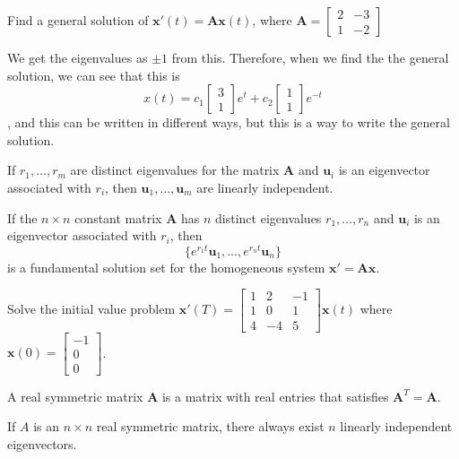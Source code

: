 \documentclass[../diffeq.tex]{subfiles}
\begin{document}
\begin{example}
    Find a general solution of $\textbf{x}'(t)=\textbf{Ax}(t)$, where $\textbf{A}=\begin{bmatrix}
        2 & -3\\
        1 & -2
    \end{bmatrix}$

    We get the eigenvalues as $\pm 1$ from this. Therefore, when we find the the general solution, we can see that this is 
    \[ x(t)=c_1\begin{bmatrix}
        3\\1
    \end{bmatrix}e^t + c_2\begin{bmatrix}
        1\\1
    \end{bmatrix}e^{-t} \], and this can be written in different ways, but this is a way to write the general solution.
\end{example}

\begin{theorem}
    If $r_1,\dots,r_m$ are distinct eigenvalues for the matrix $\textbf{A}$ and $\textbf{u}_i$ is an eigenvector associated with $r_i$, then $\textbf{u}_1,\dots,\textbf{u}_m$ are linearly independent.
\end{theorem}

\begin{corollary}
    If the $n\times n$ constant matrix $\textbf{A}$ has $n$ distinct eigenvalues $r_1,\dots,r_n$ and $\textbf{u}_i$ is an eigenvector associated with $r_i$, then 
    \[ \{ e^{r_1t}\textbf{u}_1,\dots,e^{r_nt}\textbf{u}_n \} \]
    is a fundamental solution set for the homogeneous system $\textbf{x}'=\textbf{Ax}$.
\end{corollary}

\ex Solve the initial value problem $\textbf{x}'(T)=\begin{bmatrix}
    1 & 2 & -1 \\
    1 & 0 & 1 \\
    4 & -4 & 5
\end{bmatrix}\textbf{x}(t)$ where $\textbf{x}(0)=\begin{bmatrix}
    -1\\0\\0
\end{bmatrix}$.

\begin{definition}
    A real symmetric matrix $\textbf{A}$ is a matrix with real entries that satisfies $\textbf{A}^T=\textbf{A}$.
\end{definition}
If $A$ is an $n\times n$ real symmetric matrix, there always exist $n$ linearly independent eigenvectors.
\end{document}
